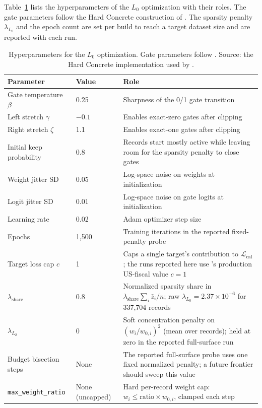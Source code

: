 Table~\ref{sp:tab:hyperparameters_full} lists the hyperparameters of the $L_0$ optimization with their
roles. The gate parameters follow the Hard Concrete construction of \citet{louizos2018}. The
sparsity penalty $\lambda_{L_0}$ and the epoch count are set per build to reach a target dataset
size and are reported with each run.

\begin{table}[H]
\centering
{\tablefont
\begin{tabular}{@{}l l p{}@{}}
\toprule
Parameter & Value & Role \\
\midrule
Gate temperature $\beta$ & 0.25 & Sharpness of the 0/1 gate transition \\
Left stretch $\gamma$ & $-0.1$ & Enables exact-zero gates after clipping \\
Right stretch $\zeta$ & 1.1 & Enables exact-one gates after clipping \\
Initial keep probability & 0.8 & Records start mostly active while leaving room for the sparsity penalty to close gates \\
Weight jitter SD & 0.05 & Log-space noise on weights at initialization \\
Logit jitter SD & 0.01 & Log-space noise on gate logits at initialization \\
Learning rate & 0.02 & Adam optimizer step size \\
Epochs & 1{,}500 & Training iterations in the reported fixed-penalty probe \\
Target loss cap $c$ & 1 & Caps a single target's contribution to $\mathcal{L}_{\text{cal}}$; the runs reported here use \populace{}'s production US-fiscal value $c=1$ \\
$\lambda_{\mathrm{share}}$ & 0.8 & Normalized sparsity share in $\lambda_{\mathrm{share}}\sum_i\bar{z}_i/n$; raw $\lambda_{L_0}=2.37\times10^{-6}$ for 337{,}704 records \\
$\lambda_{L_2}$ & $0$ & Soft concentration penalty on $(w_i/w_{0,i})^2$ (mean over records); held at zero in the reported full-surface run \\
Budget bisection steps & None & The reported full-surface probe uses one fixed normalized penalty; a future frontier should sweep this value \\
\texttt{max\_weight\_ratio} & None (uncapped) & Hard per-record weight cap: $w_i \leq \text{ratio}\times w_{0,i}$, clamped each step \\
\bottomrule
\end{tabular}
}
\caption{Hyperparameters for the $L_0$ optimization. Gate parameters follow \citet{louizos2018}.
Source: the \lzeropython{} Hard Concrete implementation used by \populace{}.}
\label{sp:tab:hyperparameters_full}
\end{table}

